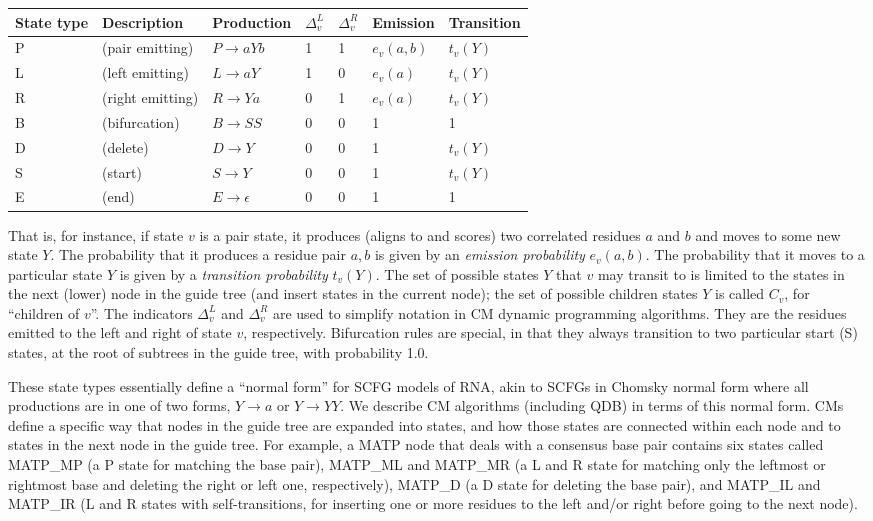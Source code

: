 \documentclass[11pt]{article}
\begin{document}
\vspace{0.5em}
\begin{tabular}{lllllll}
State type & Description &  Production   & $\Delta_v^{L}$ & $\Delta_v^{R}$ & Emission & Transition\\ \hline
P & (pair emitting)   & $P \rightarrow a Y b$ & 1 & 1 & $e_v(a,b)$ & $t_v(Y)$  \\
L & (left emitting)   & $L \rightarrow a Y$   & 1 & 0 & $e_v(a)$   & $t_v(Y)$  \\
R & (right emitting)  & $R \rightarrow Y a$   & 0 & 1 & $e_v(a)$   & $t_v(Y)$  \\
B & (bifurcation)     & $B \rightarrow S S$   & 0 & 0 & 1     &     1     \\
D & (delete)          & $D \rightarrow Y$     & 0 & 0 & 1     &   $t_v(Y)$  \\
S & (start)           & $S \rightarrow Y$     & 0 & 0 &    1     & $t_v(Y)$  \\
E & (end)             & $E \rightarrow \epsilon$ & 0 & 0 & 1     &     1     \\
\end{tabular}
\vspace{0.5em}

That is, for instance, if state $v$ is a pair state, it produces
(aligns to and scores) two correlated residues $a$ and $b$ and moves
to some new state $Y$.  The probability that it produces a residue
pair $a,b$ is given by an \emph{emission probability} $e_v(a,b)$.  The
probability that it moves to a particular state $Y$ is given by a
\emph{transition probability} $t_v(Y)$.  The set of possible states
$Y$ that $v$ may transit to is limited to the states in the next
(lower) node in the guide tree (and insert states in the current
node); the set of possible children states $Y$ is called $C_v$, for
``children of $v$''. The indicators $\Delta_v^{L}$ and $\Delta_v^{R}$
are used to simplify notation in CM dynamic programming algorithms.
They are the residues emitted to the left and right of state $v$,
respectively. Bifurcation rules are special, in that they always
transition to two particular start (S) states, at the root of
subtrees in the guide tree, with probability 1.0.

These state types essentially define a ``normal form'' for SCFG
models of RNA, akin to SCFGs in Chomsky normal form where all
productions are in one of two forms, $Y \rightarrow a$ or $Y
\rightarrow YY$. We describe CM algorithms (including QDB) in terms of
this normal form. CMs define a specific way that nodes in the guide
tree are expanded into states, and how those states are connected
within each node and to states in the next node in the guide tree. For
example, a MATP node that deals with a consensus base pair contains
six states called MATP\_MP (a P state for matching the base pair),
MATP\_ML and MATP\_MR (a L and R state for matching only the leftmost
or rightmost base and deleting the right or left one, respectively),
MATP\_D (a D state for deleting the base pair), and MATP\_IL and
MATP\_IR (L and R states with self-transitions, for inserting one or
more residues to the left and/or right before going to the next
node).
\end{document}
